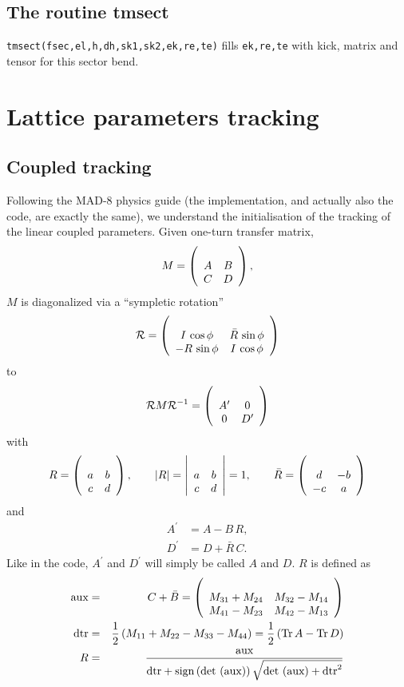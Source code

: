 \documentclass{cern-art} %
\renewcommand{\L}[1]{\lstinline[firstnumber=last]{#1}}
\begin{document}
\subsection{The routine {tmsect}}
\L{tmsect(fsec,el,h,dh,sk1,sk2,ek,re,te)} fills \L{ek,re,te} with kick, matrix and tensor for this sector bend.

\section{Lattice parameters tracking}
\subsection{Coupled tracking}
Following the MAD-8 physics guide (the implementation, and actually also the code, are exactly the same), we understand the initialisation of the tracking of the linear coupled parameters. Given one-turn transfer matrix,
$$M=\left(\begin{array}[t]{cc}
A & B\\
C & D
\end{array}\right),$$
$M$ is diagonalized via a ``sympletic rotation'' $$\mathcal{R}=\left(\begin{array}[t]{cc}
I\,\cos\phi & \bar{R}\,\sin\phi\\
-R\,\sin\phi & I\,\cos\phi
\end{array}\right)$$
to
$$\mathcal{R}M\mathcal{R}^{-1}=\left(\begin{array}[t]{cc}
A^{\prime} & 0\\
0 & D^{\prime}
\end{array}\right)$$
with
$$R=\left(\begin{array}[t]{cc}
a & b\\
c & d
\end{array}\right),\qquad\left|R\right|=\left|\begin{array}[t]{cc}
a & b\\
c & d
\end{array}\right|=1,\qquad\bar{R}=\left(\begin{array}[t]{cc}
d & -b\\
-c & a
\end{array}\right)
$$
and
$$\begin{aligned}A^{\prime} & =A-B\, R,\\
D^{\prime} & =D+\bar{R}\, C.
\end{aligned}$$
Like in the code, $A^{\prime}$ and $D^{\prime}$ will simply be called $A$ and $D$. $R$ is defined as
\begin{eqnarray*}
\text{aux} & = & C+\bar{B}=\left(\begin{array}[t]{cc}
M_{31}+M_{24} & M_{32}-M_{14}\\
M_{41}-M_{23} & M_{42}-M_{13}
\end{array}\right)\\
\text{dtr} & = & \frac{1}{2}\left(M_{11}+M_{22}-M_{33}-M_{44}\right)=\frac{1}{2}\left(\mathrm{Tr}\, A-\mathrm{Tr}\, D\right)\\
R & = & \frac{\text{aux}}{\text{dtr}+\mathrm{sign}\left(\mathrm{det}\,\left(\text{aux}\right)\right)\sqrt{\mathrm{det}\,\left(\text{aux}\right)+\text{dtr}^{2}}}
\end{eqnarray*}
\end{document}
